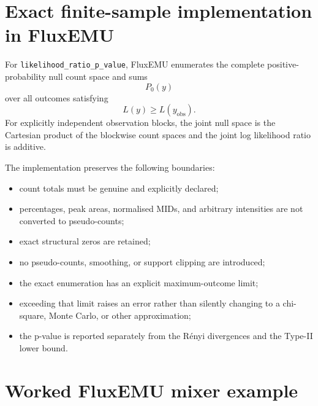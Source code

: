 \documentclass[11pt]{article}
\begin{document}
\section{Exact finite-sample implementation in FluxEMU}

For \texttt{likelihood\_ratio\_p\_value}, FluxEMU enumerates the complete
positive-probability null count space and sums
\begin{equation}
P_0(y)
\end{equation}
over all outcomes satisfying
\begin{equation}
L(y)\ge L(y_{\mathrm{obs}}).
\end{equation}
For explicitly independent observation blocks, the joint null space is the
Cartesian product of the blockwise count spaces and the joint log likelihood
ratio is additive.

The implementation preserves the following boundaries:
\begin{itemize}
    \item count totals must be genuine and explicitly declared;
    \item percentages, peak areas, normalised MIDs, and arbitrary intensities are not converted to pseudo-counts;
    \item exact structural zeros are retained;
    \item no pseudo-counts, smoothing, or support clipping are introduced;
    \item the exact enumeration has an explicit maximum-outcome limit;
    \item exceeding that limit raises an error rather than silently changing to a chi-square, Monte Carlo, or other approximation;
    \item the p-value is reported separately from the Rényi divergences and the Type-II lower bound.
\end{itemize}

\section{Worked FluxEMU mixer example}
\end{document}
